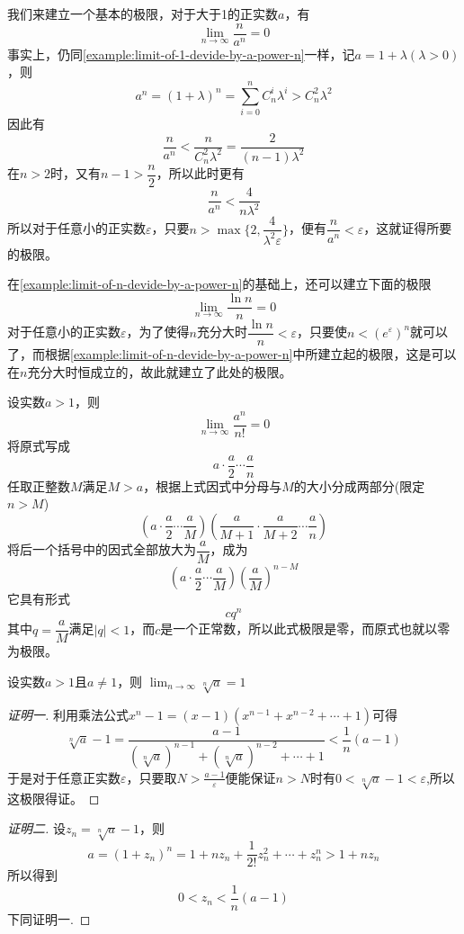 \begin{example}
  \label{example:limit-of-n-devide-by-a-power-n}
  我们来建立一个基本的极限，对于大于1的正实数$a$，有
  \[ \lim_{n \to \infty} \frac{n}{a^n} = 0 \]
  事实上，仍同\autoref{example:limit-of-1-devide-by-a-power-n}一样，记$a=1+\lambda(\lambda>0)$，则
  \[ a^n=(1+\lambda)^n=\sum_{i=0}^nC_n^i\lambda^i > C_n^2 \lambda^2 \]
  因此有
  \[ \frac{n}{a^n} < \frac{n}{C_n^2 \lambda^2} = \frac{2}{(n-1)\lambda^2} \]
  在$n>2$时，又有$n-1>\dfrac{n}{2}$，所以此时更有
  \[ \frac{n}{a^n} < \frac{4}{n\lambda^2} \]
  所以对于任意小的正实数$\varepsilon$，只要$n>\max\{2,\dfrac{4}{\lambda^2\varepsilon}\}$，便有$\dfrac{n}{a^n} < \varepsilon$，这就证得所要的极限。
\end{example}

\begin{example}
  \label{example:limit-of-lnn-devide-by-n}
  在\autoref{example:limit-of-n-devide-by-a-power-n}的基础上，还可以建立下面的极限
  \[ \lim_{n \to \infty} \frac{\ln{n}}{n} = 0 \]
  对于任意小的正实数$\varepsilon$，为了使得$n$充分大时$\dfrac{\ln{n}}{n} < \varepsilon$，只要使$n<(e^{\varepsilon})^n$就可以了，而根据\autoref{example:limit-of-n-devide-by-a-power-n}中所建立起的极限，这是可以在$n$充分大时恒成立的，故此就建立了此处的极限。
\end{example}

\begin{example}
  \label{example:limit-of-a-power-n-devide-by-n-fraction}
  设实数$a>1$，则
  \[ \lim_{n \to \infty} \frac{a^n}{n!} = 0 \]
  将原式写成
  \[ a \cdot \frac{a}{2} \cdots \frac{a}{n} \]
  任取正整数$M$满足$M>a$，根据上式因式中分母与$M$的大小分成两部分(限定$n>M$)
  \[ \left( a \cdot \frac{a}{2} \cdots \frac{a}{M} \right) \left( \frac{a}{M+1} \cdot \frac{a}{M+2} \cdots \frac{a}{n} \right) \]
  将后一个括号中的因式全部放大为$\dfrac{a}{M}$，成为
  \[ \left( a \cdot \frac{a}{2} \cdots \frac{a}{M} \right) \left( \frac{a}{M} \right)^{n-M} \]
  它具有形式
  \[ c q^n \]
  其中$q=\dfrac{a}{M}$满足$|q|<1$，而$c$是一个正常数，所以此式极限是零，而原式也就以零为极限。
\end{example}

\begin{example}
  \label{example:limit-of-n-sqrt-a-when-a-greater-than-1}
  设实数$a>1$且$a \neq 1$，则 $\lim_{n \to \infty} \sqrt[n]{a} = 1$

  \begin{proof}[证明一]
    利用乘法公式$x^n-1=(x-1)(x^{n-1}+x^{n-2}+\cdots+1)$可得
    \[ \sqrt[n]{a}-1 = \frac{a-1}{(\sqrt[n]{a})^{n-1}+(\sqrt[n]{a})^{n-2}+\cdots+1} < \frac{1}{n}(a-1) \]
   于是对于任意正实数$\varepsilon$，只要取$N>\frac{a-1}{\varepsilon}$便能保证$n>N$时有$0<\sqrt[n]{a}-1<\varepsilon$,所以这极限得证。
  \end{proof}

  \begin{proof}[证明二]
    设$z_n=\sqrt[n]{a}-1$，则
    \[ a = (1+z_n)^n = 1+ nz_n+\frac{1}{2!}z_n^2+\cdots+z_n^n > 1+ n z_n \]
    所以得到
    \[ 0<z_n<\frac{1}{n}(a-1) \]
    下同证明一.
  \end{proof}
\end{example}

